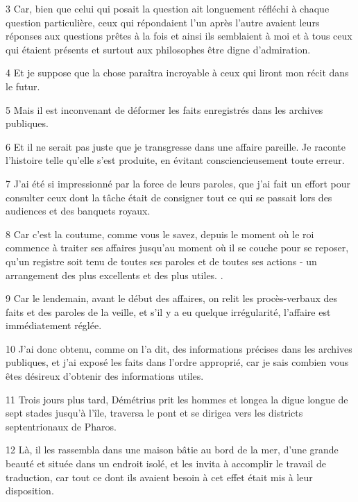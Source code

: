 \par 3 Car, bien que celui qui posait la question ait longuement réfléchi à chaque question particulière, ceux qui répondaient l'un après l'autre avaient leurs réponses aux questions prêtes à la fois et ainsi ils semblaient à moi et à tous ceux qui étaient présents et surtout aux philosophes être digne d'admiration.

\par 4 Et je suppose que la chose paraîtra incroyable à ceux qui liront mon récit dans le futur.

\par 5 Mais il est inconvenant de déformer les faits enregistrés dans les archives publiques.

\par 6 Et il ne serait pas juste que je transgresse dans une affaire pareille. Je raconte l'histoire telle qu'elle s'est produite, en évitant consciencieusement toute erreur.

\par 7 J'ai été si impressionné par la force de leurs paroles, que j'ai fait un effort pour consulter ceux dont la tâche était de consigner tout ce qui se passait lors des audiences et des banquets royaux.

\par 8 Car c'est la coutume, comme vous le savez, depuis le moment où le roi commence à traiter ses affaires jusqu'au moment où il se couche pour se reposer, qu'un registre soit tenu de toutes ses paroles et de toutes ses actions - un arrangement des plus excellents et des plus utiles. .

\par 9 Car le lendemain, avant le début des affaires, on relit les procès-verbaux des faits et des paroles de la veille, et s'il y a eu quelque irrégularité, l'affaire est immédiatement réglée.

\par 10 J'ai donc obtenu, comme on l'a dit, des informations précises dans les archives publiques, et j'ai exposé les faits dans l'ordre approprié, car je sais combien vous êtes désireux d'obtenir des informations utiles.

\par 11 Trois jours plus tard, Démétrius prit les hommes et longea la digue longue de sept stades jusqu'à l'île, traversa le pont et se dirigea vers les districts septentrionaux de Pharos.

\par 12 Là, il les rassembla dans une maison bâtie au bord de la mer, d'une grande beauté et située dans un endroit isolé, et les invita à accomplir le travail de traduction, car tout ce dont ils avaient besoin à cet effet était mis à leur disposition.

